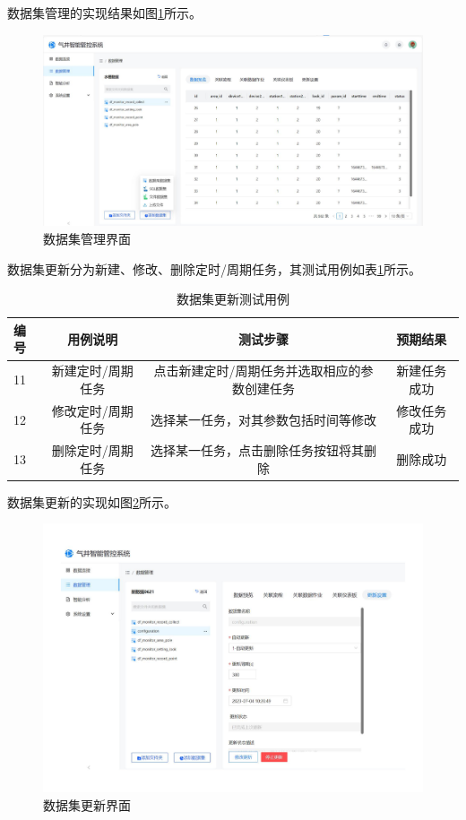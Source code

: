 数据集管理的实现结果如图\ref{fig:dasetre}所示。

\begin{figure}
    \centering
    \includegraphics{figure/数据集管理.pdf}
    \caption{数据集管理界面}
    \label{fig:dasetre}
\end{figure}

数据集更新分为新建、修改、删除定时/周期任务，其测试用例如表\ref{tab:updatete}所示。

\begin{table}
    \renewcommand{\arraystretch}{1.5}
    \centering
    \caption{数据集更新测试用例}
    \label{tab:updatete}
    \begin{tabular}{|l|c|c|c|}
        \hline
        编号 & 用例说明 &测试步骤 & 预期结果 \\
        \hline
        11 & 新建定时/周期任务 & 点击新建定时/周期任务并选取相应的参数创建任务 & 新建任务成功 \\
        \hline
        12 & 修改定时/周期任务 & 选择某一任务，对其参数包括时间等修改 & 修改任务成功 \\
        \hline
        13 & 删除定时/周期任务 & 选择某一任务，点击删除任务按钮将其删除 & 删除成功 \\
        \hline
    \end{tabular}
\end{table}

数据集更新的实现如图\ref{fig:updatere}所示。

\begin{figure}
    \centering
    \includegraphics{figure/数据集操作.pdf}
    \caption{数据集更新界面}
    \label{fig:updatere}
\end{figure}

